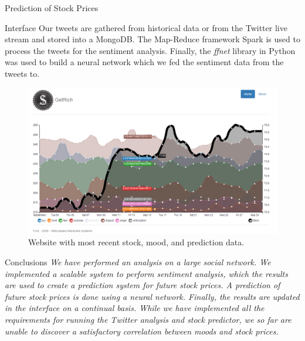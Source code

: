 \documentclass[final,table]{beamer}
\newlength{\twocolwid}
\begin{document}
\begin{frame}[t]
\begin{columns}[t]
\begin{column}{\twocolwid}
\begin{block}{Prediction of Stock Prices}
\end{block}
\begin{block}{Interface}
Our tweets are gathered  from historical data or from the Twitter live stream and stored into a MongoDB.  The Map-Reduce framework Spark is used to process the tweets for the sentiment analysis. Finally, the \emph{ffnet} library in Python was used to build a neural network which we fed the sentiment data from the tweets to.
\begin{center}
\begin{figure}
          \includegraphics[width=60ex]{sitefinished.png}
          \caption{Website with most recent stock, mood, and prediction data.}
\end{figure}
\end{center}

\end{block}

\begin{block}{Conclusions}
\emph{We have performed an analysis on a large social network. We implemented a scalable system to perform sentiment analysis, which the results are used to create a prediction system for future stock prices. A prediction of future stock prices is done using a neural network. Finally, the results are updated in the interface on a continual basis. While we have implemented all the requirements for running the Twitter analysis and stock predictor, we so far are unable to discover a satisfactory correlation between moods and stock prices. }
\end{block}



\end{column}
\end{columns}
\end{frame}
\end{document}
